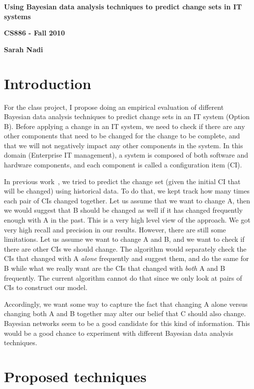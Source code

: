 \documentclass{article}
\date{}
\begin{document}
\centerline{\sc \large \textbf{Using Bayesian data analysis techniques to predict change sets in IT systems}}
\centerline{\textbf{CS886 - Fall 2010}}
\centerline{\textbf{Sarah Nadi}}
\vspace{2pc}

\section{Introduction}

For the class project, I propose doing an empirical evaluation of different Bayesian data analysis techniques to predict change sets in an IT system (Option
B). Before applying a change in an IT system, we need to check if there are any other components that need to be changed for the change to be complete, and
that we will not negatively impact any other components in the system. In this domain (Enterprise IT management), a system is composed of both software and
hardware components, and each component is called a configuration item (CI). 

In previous work~\cite{nadi2010}, we tried to predict the change set (given the initial CI that will be changed) using historical data. To do that, we
kept track how many times each pair of CIs changed together. Let us assume that we want to change A, then we would suggest that B should be changed as
well if it has changed frequently enough with A in the past. This is a very high level view of the approach. We got very high recall and precision in
our results. However, there are still some limitations. Let us assume we want to change A and B, and we want to check if there are other CIs we should
change. The algorithm would separately check the CIs that changed with A \textit{alone} frequently and suggest them, and do the same for B while what we really
want are the CIs that changed with \textit{both} A and B frequently. The current algorithm cannot do that since we only look at pairs of CIs to construct our
model.

Accordingly, we want some way to capture the fact that changing A alone versus changing both A and B together may alter our belief that C should also change.
Bayesian networks seem to be a good candidate for this kind of information. This would be a good chance to experiment with different Bayesian data analysis
techniques.

\section{Proposed techniques}
\end{document}
